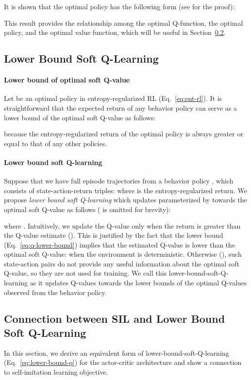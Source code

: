 \documentclass{article}
\newcommand{\cutsubsectionup}{\vspace*{-0.05in}}\newcommand{\cutsubsectiondown}{\vspace*{-0.05in}}
\begin{document}
It is shown that the optimal policy  has the following form (see \citet{ziebart2010modeling,Haarnoja2017ReinforcementLW} for the proof):
 
This result provides the relationship among the optimal Q-function, the optimal policy, and the optimal value function, which will be useful in Section~\ref{sec:connection}.

\cutsubsectionup
\subsection{Lower Bound Soft Q-Learning} \label{sec:lower-bound-soft-q-learning}
\cutsubsectiondown
\paragraph{Lower bound of optimal soft Q-value} Let  be an optimal policy in entropy-regularized RL (Eq.~\ref{eq:ent-rl}). It is straightforward that the expected return of any behavior policy  can serve as a lower bound of the optimal soft Q-value as follows:

because the entropy-regularized return of the optimal policy is always greater or equal to that of any other policies.
\paragraph{Lower bound soft Q-learning}
Suppose that we have full episode trajectories from a behavior policy , which consists of state-action-return triples:  where  is the entropy-regularized return. 
We propose \textit{lower bound soft Q-learning} which updates  parameterized by  towards the optimal soft Q-value as follows ( is omitted for brevity):

where . 
Intuitively, we update the Q-value only when the return is greater than the Q-value estimate (). This is justified by the fact that the lower bound (Eq.~\ref{eq:q-lower-bound}) implies that the estimated Q-value is lower than the optimal soft Q-value:  when the environment is deterministic. 
Otherwise (), such state-action pairs do not provide any useful information about the optimal soft Q-value, so they are not used for training. 
We call this lower-bound-soft-Q-learning as it updates Q-values towards the lower bounds of the optimal Q-values observed from the behavior policy. 


\cutsubsectionup
\subsection{Connection between SIL and Lower Bound Soft Q-Learning}  \label{sec:connection}
\cutsubsectiondown
In this section, we derive an equivalent form of lower-bound-soft-Q-learning (Eq.~\ref{eq:lower-bound-q}) for the actor-critic architecture and show a connection to self-imitation learning objective. 
\end{document}
